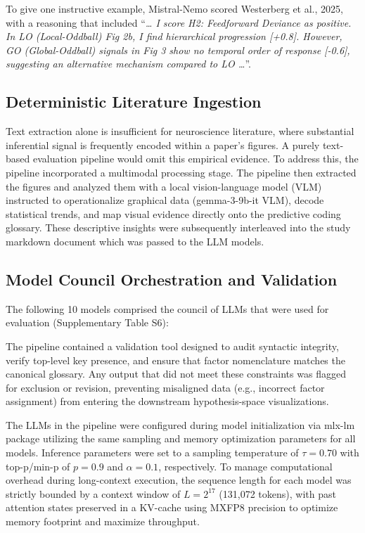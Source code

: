\documentclass[12pt]{article}
\begin{document}
To give one instructive example, Mistral-Nemo scored Westerberg et al., 2025, with a reasoning that included ``\emph{\ldots{} I score H2: Feedforward Deviance as positive. In LO (Local-Oddball) Fig 2b, I find hierarchical progression {[}+0.8{]}. However, GO (Global-Oddball) signals in Fig 3 show no temporal order of response {[}-0.6{]}, suggesting an alternative mechanism compared to LO \ldots{}}''.

\subsection{Deterministic Literature Ingestion}\label{deterministic-literature-ingestion}

Text extraction alone is insufficient for neuroscience literature, where substantial inferential signal is frequently encoded within a paper's figures. A purely text-based evaluation pipeline would omit this empirical evidence. To address this, the pipeline incorporated a multimodal processing stage. The pipeline then extracted the figures and analyzed them with a local vision-language model (VLM) instructed to operationalize graphical data (gemma-3-9b-it VLM), decode statistical trends, and map visual evidence directly onto the predictive coding glossary. These descriptive insights were subsequently interleaved into the study markdown document which was passed to the LLM models.

\subsection{Model Council Orchestration and Validation}\label{model-council-orchestration-and-validation}

The following 10 models comprised the council of LLMs that were used for evaluation (Supplementary Table S6):




The pipeline contained a validation tool designed to audit syntactic integrity, verify top-level key presence, and ensure that factor nomenclature matches the canonical glossary. Any output that did not meet these constraints was flagged for exclusion or revision, preventing misaligned data (e.g., incorrect factor assignment) from entering the downstream hypothesis-space visualizations.

The LLMs in the pipeline were configured during model initialization via mlx-lm package utilizing the same sampling and memory optimization parameters for all models. Inference parameters were set to a sampling temperature\cite{ref84} of $\tau = 0.70$ with top-p/min-p of $p = 0.9$ and $\alpha = 0.1$, respectively. To manage computational overhead during long-context execution, the sequence length for each model was strictly bounded by a context window of $L = 2^{17}$ (131,072 tokens), with past attention states preserved in a KV-cache using MXFP8\cite{ref85} precision to optimize memory footprint and maximize throughput.
\end{document}
